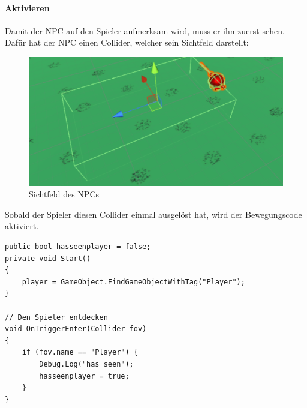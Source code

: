 \paragraph{Aktivieren}
Damit der NPC auf den Spieler aufmerksam wird, muss er ihn zuerst sehen.
Dafür hat der NPC einen Collider, welcher sein Sichtfeld darstellt:
\begin{figure}[H]
\includegraphics[scale=1]{screenshots/fov.png}
\caption{Sichtfeld des NPCs}
\end{figure}
\noindent Sobald der Spieler diesen Collider einmal ausgelöst hat, wird der Bewegungscode aktiviert.
\begin{lstlisting}
public bool hasseenplayer = false;
private void Start()
{
	player = GameObject.FindGameObjectWithTag("Player");
}
	
// Den Spieler entdecken
void OnTriggerEnter(Collider fov)
{	
	if (fov.name == "Player") {
		Debug.Log("has seen");
		hasseenplayer = true;
	}
}
\end{lstlisting}
